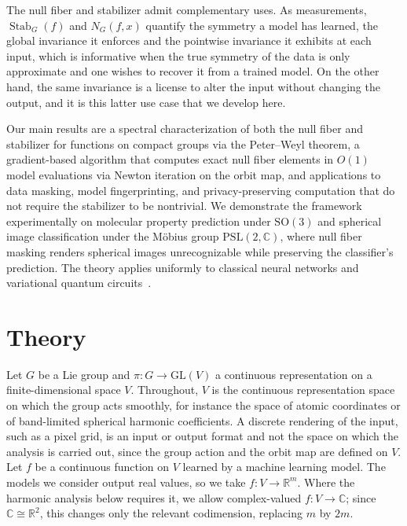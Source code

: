 \documentclass[11pt]{article}
\DeclareMathOperator{\Stab}{Stab}
\newcommand{\CC}{\mathbb{C}}
\newcommand{\RR}{\mathbb{R}}
\begin{document}
The null fiber and stabilizer admit complementary uses. As measurements, $\Stab_G(f)$ and $N_G(f,x)$ quantify the symmetry a model has learned, the global invariance it enforces and the pointwise invariance it exhibits at each input, which is informative when the true symmetry of the data is only approximate and one wishes to recover it from a trained model. On the other hand, the same invariance is a license to alter the input without changing the output, and it is this latter use case that we develop here.

Our main results are a spectral characterization of both the null fiber and stabilizer for functions on compact groups via the Peter--Weyl theorem, a gradient-based algorithm that computes exact null fiber elements in $O(1)$ model evaluations via Newton iteration on the orbit map, and applications to data masking, model fingerprinting, and privacy-preserving computation that do not require the stabilizer to be nontrivial. We demonstrate the framework experimentally on molecular property prediction under $\mathrm{SO}(3)$ and spherical image classification under the M\"obius group $\mathrm{PSL}(2, \CC)$, where null fiber masking renders spherical images unrecognizable while preserving the classifier's prediction. The theory applies uniformly to classical neural networks and variational quantum circuits~\cite{biamonte2017quantum,cerezo2021variational,gili2023quantum,schuld2020circuit}.

\section{Theory}\label{sec:null-fibers-subgroups}

Let $G$ be a Lie group and $\pi\colon G \to \mathrm{GL}(V)$ a continuous representation on a finite-dimensional space $V$. Throughout, $V$ is the continuous representation space on which the group acts smoothly, for instance the space of atomic coordinates or of band-limited spherical harmonic coefficients. A discrete rendering of the input, such as a pixel grid, is an input or output format and not the space on which the analysis is carried out, since the group action and the orbit map are defined on $V$. Let $f$ be a continuous function on $V$ learned by a machine learning model. The models we consider output real values, so we take $f\colon V \to \RR^m$. Where the harmonic analysis below requires it, we allow complex-valued $f\colon V \to \CC$; since $\CC \cong \RR^2$, this changes only the relevant codimension, replacing $m$ by $2m$.
\end{document}
